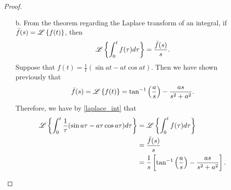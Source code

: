 \begin{proof}
\begin{enumerate}
    \item[b.] From the theorem regarding the Laplace transform of an integral, if $\bar{f}(s) = \mathscr{L}\left\{ {f(t)} \right\}$,
      then
      \begin{align}\label{laplace_int}
        \mathscr{L}\left\{ {\int_0^t f(\tau) d\tau} \right\} = \frac{\bar{f}(s)}{s}.
      \end{align}
      Suppose that $\displaystyle f(t) = \frac{1}{t}(\sin at - at \cos at)$. Then we have shown
      previously that
      \begin{align*}
        \bar{f}(s) = \mathscr{L}\left\{ {f(t)} \right\} = \tan^{-1}\left(\frac{a}{s}\right) - \frac{as}{s^2 + a^2}.
      \end{align*}
      Therefore, we have by \eqref{laplace_int} that
      \begin{align*}
        \mathscr{L}\left\{ {\int_0^t \frac{1}{\tau}(\sin a \tau - a\tau \cos a\tau) d\tau} \right\}
        &= \mathscr{L}\left\{ {\int_0^t f(\tau) d\tau} \right\} \\
        &= \frac{\bar{f}(s)}{s} \\
        &= \frac{1}{s}\left[\tan^{-1}\left(\frac{a}{s}\right) - \frac{as}{s^2 + a^2}\right] .
      \end{align*}
  \end{enumerate}
\end{proof}
\newpage
